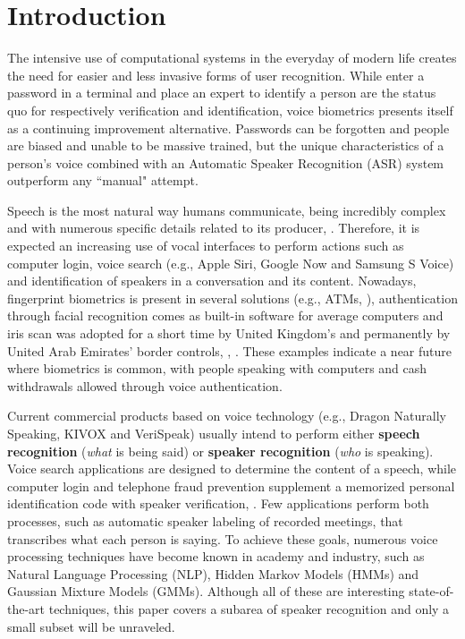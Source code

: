 \chapter{Introduction}
\label{ch:intro}

The intensive use of computational systems in the everyday of modern life creates the need for easier and less invasive forms of user recognition. While enter a password in a terminal and place an expert to identify a person are the status quo for respectively verification and identification, voice biometrics presents itself as a continuing improvement alternative. Passwords can be forgotten and people are biased and unable to be massive trained, but the unique characteristics of a person's voice combined with an Automatic Speaker Recognition (ASR) system outperform any ``manual" attempt.

Speech is the most natural way humans communicate, being incredibly complex and with numerous specific details related to its producer, . Therefore, it is expected an increasing use of vocal interfaces to perform actions such as computer login, voice search (e.g., Apple Siri, Google Now and Samsung S Voice) and identification of speakers in a conversation and its content. Nowadays, fingerprint biometrics is present in several solutions (e.g., ATMs, ), authentication through facial recognition comes as built-in software for average computers and iris scan was adopted for a short time by United Kingdom's and permanently by United Arab Emirates' border controls, , . These examples indicate a near future where biometrics is common, with people speaking with computers and cash withdrawals allowed through voice authentication.

Current commercial products based on voice technology (e.g., Dragon Naturally Speaking, KIVOX and VeriSpeak) usually intend to perform either \textbf{speech recognition} (\emph{what} is being said) or \textbf{speaker recognition} (\emph{who} is speaking). Voice search applications are designed to determine the content of a speech, while computer login and telephone fraud prevention supplement a memorized personal identification code with speaker verification, . Few applications perform both processes, such as automatic speaker labeling of recorded meetings, that transcribes what each person is saying. To achieve these goals, numerous voice processing techniques have become known in academy and industry, such as Natural Language Processing (NLP), Hidden Markov Models (HMMs) and Gaussian Mixture Models (GMMs). Although all of these are interesting state-of-the-art techniques, this paper covers a subarea of speaker recognition and only a small subset will be unraveled.

